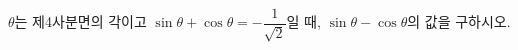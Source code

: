 $\theta$는 제4사분면의 각이고 $\sin\theta+\cos\theta=-\dfrac{1}{\sqrt{2}}$일 때, $\sin\theta-\cos\theta$의 값을 구하시오.
